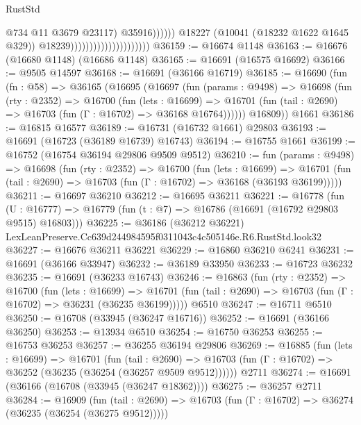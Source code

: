 \begin{lexlean}{RustStd}
\begin{coremodule}
                                                            @734
                                                            @11
                                                            @3679
                                                            @23117)
                                                          @35916))))))
                                              @18227
                                              (@10041 (@18232 @1622 @1645 @329))
                                              @18239)))))))))))))))))))))
@36159 := @16674 @1148
@36163 := @16676 (@16680 @1148) (@16686 @1148)
@36165 := @16691 (@16575 @16692)
@36166 := @9505 @14597
@36168 := @16691 (@36166 @16719)
@36185 := @16690
    (fun (fn : @58) =>
    @36165
      (@16695
        (@16697
          (fun (params : @9498) =>
          @16698
            (fun (rty : @2352) =>
            @16700
              (fun (lets : @16699) =>
              @16701 (fun (tail : @2690) => @16703 (fun (Γ : @16702) => @36168 @16764))))))
        @16809))
    @1661
@36186 := @16815 @16577
@36189 := @16731 (@16732 @1661) @29803
@36193 := @16691 (@16723 (@36189 @16739) @16743)
@36194 := @16755 @1661
@36199 := @16752 (@16754 @36194 @29806 @9509 @9512)
@36210 := fun (params : @9498) =>
  @16698
    (fun (rty : @2352) =>
    @16700
      (fun (lets : @16699) =>
      @16701 (fun (tail : @2690) => @16703 (fun (Γ : @16702) => @36168 (@36193 @36199)))))
@36211 := @16697 @36210
@36212 := @16695 @36211
@36221 := @16778
    (fun (U : @16777) => @16779 (fun (t : @7) => @16786 (@16691 (@16792 @29803 @9515) @16803)))
@36225 := @36186 (@36212 @36221) LexLeanPreserve.Cc639d244984595f0311043c4c505146e.R6.RustStd.look32
@36227 := @16676 @36211 @36221
@36229 := @16860 @36210 @6241
@36231 := @16691 (@36166 @33947)
@36232 := @36189 @33950
@36233 := @16723 @36232
@36235 := @16691 (@36233 @16743)
@36246 := @16863
    (fun (rty : @2352) =>
    @16700
      (fun (lets : @16699) =>
      @16701 (fun (tail : @2690) => @16703 (fun (Γ : @16702) => @36231 (@36235 @36199)))))
    @6510
@36247 := @16711 @6510
@36250 := @16708 (@33945 (@36247 @16716))
@36252 := @16691 (@36166 @36250)
@36253 := @13934 @6510
@36254 := @16750 @36253
@36255 := @16753 @36253
@36257 := @36255 @36194 @29806
@36269 := @16885
    (fun (lets : @16699) =>
    @16701
      (fun (tail : @2690) =>
      @16703 (fun (Γ : @16702) => @36252 (@36235 (@36254 (@36257 @9509 @9512))))))
    @2711
@36274 := @16691 (@36166 (@16708 (@33945 (@36247 @18362))))
@36275 := @36257 @2711
@36284 := @16909
    (fun (tail : @2690) => @16703 (fun (Γ : @16702) => @36274 (@36235 (@36254 (@36275 @9512)))))

\end{coremodule}
\end{lexlean}
